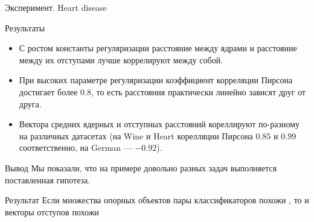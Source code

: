 \documentclass{beamer}
\begin{document}
\begin{frame}{Эксперимент. Heart disease}



\end{frame}
\begin{frame}{Результаты}
\begin{itemize}
  \item С ростом константы регуляризации расстояние между ядрами и расстояние между
  их отступами лучше коррелируют между собой.
  \item При высоких параметре регуляризации коэффициент корреляции Пирсона 
  достигает более $0.8$, то есть расстояния практически линейно зависят друг от друга.
  \item Вектора средних ядерных и отступных расстояний кореллируют по-разному на различных датасетах (на Wine и Heart корелляции Пирсона $0.85$ и $0.99$ соответственно, на German --- $-0.92$).
\end{itemize} 
\end{frame}

\begin{frame}{Вывод}
    Мы показали, что на примере довольно разных задач выполняется поставленная гипотеза.

    \begin{block}{Результат}
Если множества опорных объектов пары классификаторов похожи
    , то и векторы отступов похожи
    \end{block}
\end{frame}
\end{document}
